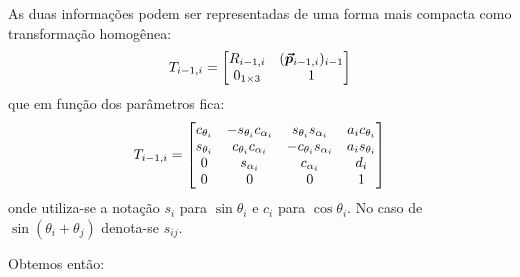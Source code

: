 As duas informações podem ser representadas de uma forma mais compacta como transformação homogênea:
\begin{equation}
T_{i-1,i} = \begin{bmatrix}
	R_{i-1,i} 		&  (\bm{\vec{p}}_{i-1,i})_{i-1} \\
	0_{1 \times 3}	&  							  1
\end{bmatrix}
\end{equation}
que em função dos parâmetros fica:
\begin{equation}
T_{i-1,i} = \begin{bmatrix}
	c_{\theta_i}  & -s_{\theta_i}c_{\alpha_i}	&	s_{\theta_i}s_{\alpha_i}  &	a_i c_{\theta_i} \\ 
	s_{\theta_i}  &	c_{\theta_i}c_{\alpha_i}	&  -c_{\theta_i}s_{\alpha_i}  & a_i s_{\theta_i} \\
	0			  & s_{\alpha_i}				&   c_{\alpha_i}			  &	d_i				 \\
	0			  & 0							&   0						  & 1
\end{bmatrix}
\end{equation}
onde utiliza-se a notação $s_i$ para $\sin \theta_i$ e $c_i$ para $\cos \theta_i$. No caso de  $\sin (\theta_i + \theta_j)$ denota-se $s_{ij}$.

Obtemos então:



